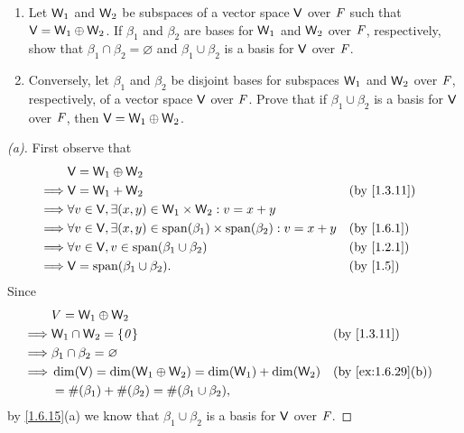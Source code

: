 \setcounter{ex}{32}
\begin{ex}\label{ex:1.6.33}
  \quad
  \begin{enumerate}
    \item Let \(\mathsf{W}_1\) and \(\mathsf{W}_2\) be subspaces of a vector space \(\mathsf{V}\) over \(\mathit{F}\) such that \(\mathsf{V} = \mathsf{W}_1 \oplus \mathsf{W}_2\).
          If \(\beta_1\) and \(\beta_2\) are bases for \(\mathsf{W}_1\) and \(\mathsf{W}_2\) over \(\mathit{F}\), respectively, show that \(\beta_1 \cap \beta_2 = \varnothing\) and \(\beta_1 \cup \beta_2\) is a basis for \(\mathsf{V}\) over \(\mathit{F}\).
    \item Conversely, let \(\beta_1\) and \(\beta_2\) be disjoint bases for subspaces \(\mathsf{W}_1\) and \(\mathsf{W}_2\) over \(\mathit{F}\), respectively, of a vector space \(\mathsf{V}\) over \(\mathit{F}\).
          Prove that if \(\beta_1 \cup \beta_2\) is a basis for \(\mathsf{V}\) over \(\mathit{F}\), then \(\mathsf{V} = \mathsf{W}_1 \oplus \mathsf{W}_2\).
  \end{enumerate}
\end{ex}

\begin{proof}[(a)]
  First observe that
  \begin{align*}
             & \V = \W_1 \oplus \W_2                                                                                \\
    \implies & \V = \W_1 + \W_2                                                                    &  & \by{1.3.11} \\
    \implies & \forall v \in \V, \exists (x, y) \in \W_1 \times \W_2 : v = x + y                                    \\
    \implies & \forall v \in \V, \exists (x, y) \in \spn{\beta_1} \times \spn{\beta_2} : v = x + y &  & \by{1.6.1}  \\
    \implies & \forall v \in \V, v \in \spn{\beta_1 \cup \beta_2}                                  &  & \by{1.2.1}  \\
    \implies & \V = \spn{\beta_1 \cup \beta_2}.                                                    &  & \by{1.5}
  \end{align*}
  Since
  \begin{align*}
             & V = \W_1 \oplus \W_2                                                               \\
    \implies & \W_1 \cap \W_2 = \set{\zv}                                  &  & \by{1.3.11}       \\
    \implies & \beta_1 \cap \beta_2 = \varnothing                                                 \\
    \implies & \dim(\V) = \dim(\W_1 \oplus \W_2) = \dim(\W_1) + \dim(\W_2) &  & \by{ex:1.6.29}[b] \\
             & = \#(\beta_1) + \#(\beta_2) = \#(\beta_1 \cup \beta_2),
  \end{align*}
  by \cref{1.6.15}(a) we know that \(\beta_1 \cup \beta_2\) is a basis for \(\mathsf{V}\) over \(\mathit{F}\).
\end{proof}

